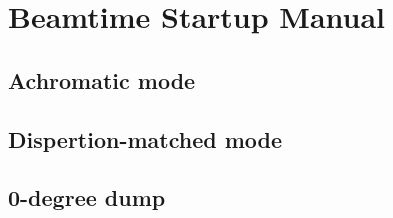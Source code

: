 \part{Beamtime Startup Manual}
\chapter{Achromatic mode}
\chapter{Dispertion-matched mode}
\chapter{0-degree dump}
